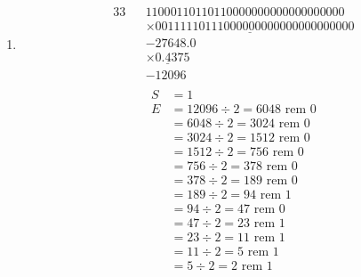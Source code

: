 \documentclass[12pt letter]{report}
\begin{document}
{\begin{enumerate}
\begin{align*}
            \\
            \underbrace{1}_{\text{Sign}} \quad
            \underbrace{10001101}_{\text{Exponent}} \quad
            \underbrace{101011111111111001}_{\text{Fraction}}
          \end{align*}
    \item
          \begin{alignat*}{33}
             &  & 1100 0110 1101 1000 0000 0000 0000 0000                    \\
             &  & \underline{\times 0011 1110 1110 0000 0000 0000 0000 0000} \\
             &  & -27648.0                                                   \\
             &  & \underline{\times 0.4375}                                  \\
             &  & -12 096                                                    \\
          \end{alignat*}
          \begin{align*}
            S                    & = 1                                  \\
            E                    & = 12096 \div 2 = 6048 \text{ rem } 0 \\
                                 & = 6048 \div 2 = 3024 \text{ rem } 0  \\
                                 & = 3024 \div 2 = 1512 \text{ rem } 0  \\
                                 & = 1512 \div 2 = 756 \text{ rem } 0   \\
                                 & = 756 \div 2 = 378 \text{ rem } 0    \\
                                 & = 378 \div 2 = 189 \text{ rem } 0    \\
                                 & = 189 \div 2 = 94 \text{ rem } 1     \\
                                 & = 94 \div 2 = 47 \text{ rem } 0      \\
                                 & = 47 \div 2 = 23 \text{ rem } 1      \\
                                 & = 23 \div 2 = 11 \text{ rem } 1      \\
                                 & = 11 \div 2 = 5 \text{ rem } 1       \\
                                 & = 5 \div 2 = 2 \text{ rem } 1        \\

\end{align*}
\end{enumerate}}
\end{document}
